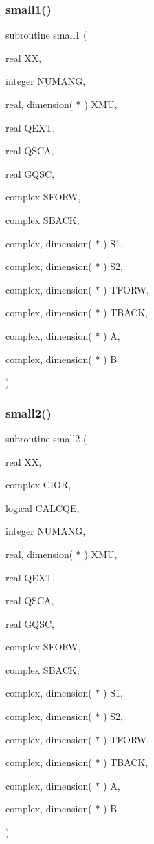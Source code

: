 \subsubsection{\texorpdfstring{small1()}{small1()}}
{\footnotesize\ttfamily subroutine small1 (\begin{DoxyParamCaption}\item[{real}]{XX,  }\item[{integer}]{N\+U\+M\+A\+NG,  }\item[{real, dimension( $\ast$ )}]{X\+MU,  }\item[{real}]{Q\+E\+XT,  }\item[{real}]{Q\+S\+CA,  }\item[{real}]{G\+Q\+SC,  }\item[{complex}]{S\+F\+O\+RW,  }\item[{complex}]{S\+B\+A\+CK,  }\item[{complex, dimension( $\ast$ )}]{S1,  }\item[{complex, dimension( $\ast$ )}]{S2,  }\item[{complex, dimension( $\ast$ )}]{T\+F\+O\+RW,  }\item[{complex, dimension( $\ast$ )}]{T\+B\+A\+CK,  }\item[{complex, dimension( $\ast$ )}]{A,  }\item[{complex, dimension( $\ast$ )}]{B }\end{DoxyParamCaption})}

\mbox{\label{_m_i_e_v0_8f_a4bae82b3142e7b49e6b14b735ea23988}} 
\subsubsection{\texorpdfstring{small2()}{small2()}}
{\footnotesize\ttfamily subroutine small2 (\begin{DoxyParamCaption}\item[{real}]{XX,  }\item[{complex}]{C\+I\+OR,  }\item[{logical}]{C\+A\+L\+C\+QE,  }\item[{integer}]{N\+U\+M\+A\+NG,  }\item[{real, dimension( $\ast$ )}]{X\+MU,  }\item[{real}]{Q\+E\+XT,  }\item[{real}]{Q\+S\+CA,  }\item[{real}]{G\+Q\+SC,  }\item[{complex}]{S\+F\+O\+RW,  }\item[{complex}]{S\+B\+A\+CK,  }\item[{complex, dimension( $\ast$ )}]{S1,  }\item[{complex, dimension( $\ast$ )}]{S2,  }\item[{complex, dimension( $\ast$ )}]{T\+F\+O\+RW,  }\item[{complex, dimension( $\ast$ )}]{T\+B\+A\+CK,  }\item[{complex, dimension( $\ast$ )}]{A,  }\item[{complex, dimension( $\ast$ )}]{B }\end{DoxyParamCaption})}


